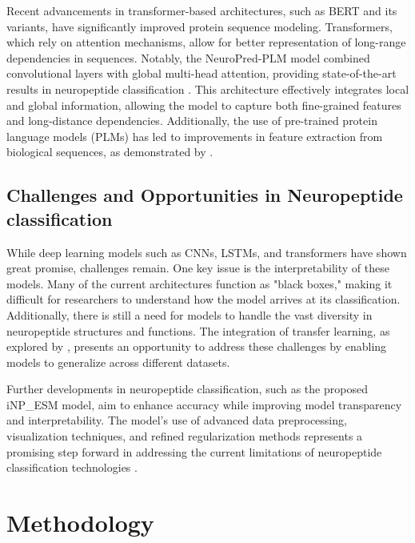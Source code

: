 \documentclass[conference]{IEEEtran}
\begin{document}
Recent advancements in transformer-based architectures, such as BERT and its variants, have significantly improved protein sequence modeling. Transformers, which rely on attention mechanisms, allow for better representation of long-range dependencies in sequences. Notably, the NeuroPred-PLM model combined convolutional layers with global multi-head attention, providing state-of-the-art results in neuropeptide classification \cite{rives2021}. This architecture effectively integrates local and global information, allowing the model to capture both fine-grained features and long-distance dependencies. Additionally, the use of pre-trained protein language models (PLMs) has led to improvements in feature extraction from biological sequences, as demonstrated by \cite{rives2021}.

\subsection{Challenges and Opportunities in Neuropeptide classification} While deep learning models such as CNNs, LSTMs, and transformers have shown great promise, challenges remain. One key issue is the interpretability of these models. Many of the current architectures function as "black boxes," making it difficult for researchers to understand how the model arrives at its classification. Additionally, there is still a need for models to handle the vast diversity in neuropeptide structures and functions. The integration of transfer learning, as explored by \cite{elnaggar2021}, presents an opportunity to address these challenges by enabling models to generalize across different datasets.

Further developments in neuropeptide classification, such as the proposed iNP\_ESM model, aim to enhance accuracy while improving model transparency and interpretability. The model's use of advanced data preprocessing, visualization techniques, and refined regularization methods represents a promising step forward in addressing the current limitations of neuropeptide classification technologies \cite{li2024}.





\section{Methodology}
\end{document}
